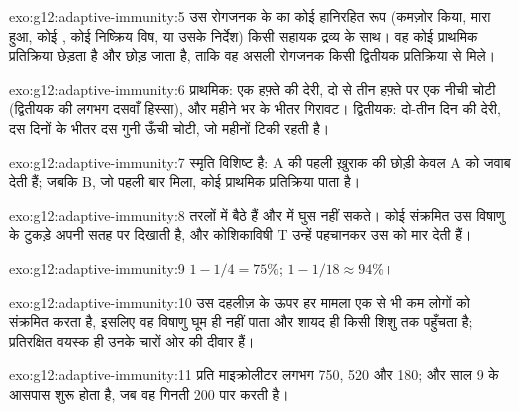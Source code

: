 \begin{solution}{exo:g12:adaptive-immunity:5}
उस रोगजनक के  का कोई हानिरहित रूप (कमज़ोर किया, मारा हुआ, कोई
, कोई निष्क्रिय विष, या उसके निर्देश) किसी सहायक द्रव्य के साथ। वह
कोई प्राथमिक प्रतिक्रिया छेड़ता है और  छोड़ जाता है, ताकि वह
असली रोगजनक किसी द्वितीयक प्रतिक्रिया से मिले।
\end{solution}

\begin{solution}{exo:g12:adaptive-immunity:6}
प्राथमिक: एक हफ़्ते की देरी, दो से तीन हफ़्ते पर एक नीची चोटी (द्वितीयक की
लगभग दसवाँ हिस्सा), और महीने भर के भीतर गिरावट। द्वितीयक: दो-तीन दिन की
देरी, दस दिनों के भीतर दस गुनी ऊँची चोटी, जो महीनों टिकी रहती है।
\end{solution}

\begin{solution}{exo:g12:adaptive-immunity:7}
स्मृति विशिष्ट है: A की पहली ख़ुराक की छोड़ी  केवल A को जवाब
देती हैं; जबकि B, जो पहली बार मिला, कोई प्राथमिक प्रतिक्रिया पाता है।
\end{solution}

\begin{solution}{exo:g12:adaptive-immunity:8}
 तरलों में बैठे  हैं और  में घुस नहीं सकते। कोई
संक्रमित  उस विषाणु के टुकड़े अपनी सतह पर दिखाती है, और कोशिकाविषी T
 उन्हें पहचानकर उस  को मार देती हैं।
\end{solution}

\begin{solution}{exo:g12:adaptive-immunity:9}
$1 - 1/4 = 75\%$; $1 - 1/18 \approx 94\%$।
\end{solution}

\begin{solution}{exo:g12:adaptive-immunity:10}
उस दहलीज़ के ऊपर हर मामला एक से भी कम लोगों को संक्रमित करता है, इसलिए वह
विषाणु घूम ही नहीं पाता और शायद ही किसी शिशु तक पहुँचता है; प्रतिरक्षित
वयस्क ही उनके चारों ओर की दीवार हैं।
\end{solution}

\begin{solution}{exo:g12:adaptive-immunity:11}
प्रति माइक्रोलीटर लगभग 750, 520 और 180; और  साल 9 के आसपास शुरू होता है,
जब वह गिनती 200 पार करती है।
\end{solution}

